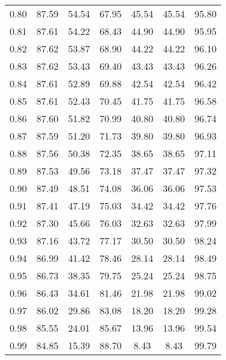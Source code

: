 \begin{tabular}{|c|c|c|c|c|c|c|}
      0.80 &     87.59 &     54.54 &      67.95 &   45.54 &      45.54 &         95.80 \\
      0.81 &     87.61 &     54.22 &      68.43 &   44.90 &      44.90 &         95.95 \\
      0.82 &     87.62 &     53.87 &      68.90 &   44.22 &      44.22 &         96.10 \\
      0.83 &     87.62 &     53.43 &      69.40 &   43.43 &      43.43 &         96.26 \\
      0.84 &     87.61 &     52.89 &      69.88 &   42.54 &      42.54 &         96.42 \\
      0.85 &     87.61 &     52.43 &      70.45 &   41.75 &      41.75 &         96.58 \\
      0.86 &     87.60 &     51.82 &      70.99 &   40.80 &      40.80 &         96.74 \\
      0.87 &     87.59 &     51.20 &      71.73 &   39.80 &      39.80 &         96.93 \\
      0.88 &     87.56 &     50.38 &      72.35 &   38.65 &      38.65 &         97.11 \\
      0.89 &     87.53 &     49.56 &      73.18 &   37.47 &      37.47 &         97.32 \\
      0.90 &     87.49 &     48.51 &      74.08 &   36.06 &      36.06 &         97.53 \\
      0.91 &     87.41 &     47.19 &      75.03 &   34.42 &      34.42 &         97.76 \\
      0.92 &     87.30 &     45.66 &      76.03 &   32.63 &      32.63 &         97.99 \\
      0.93 &     87.16 &     43.72 &      77.17 &   30.50 &      30.50 &         98.24 \\
      0.94 &     86.99 &     41.42 &      78.46 &   28.14 &      28.14 &         98.49 \\
      0.95 &     86.73 &     38.35 &      79.75 &   25.24 &      25.24 &         98.75 \\
      0.96 &     86.43 &     34.61 &      81.46 &   21.98 &      21.98 &         99.02 \\
      0.97 &     86.02 &     29.86 &      83.08 &   18.20 &      18.20 &         99.28 \\
      0.98 &     85.55 &     24.01 &      85.67 &   13.96 &      13.96 &         99.54 \\
      0.99 &     84.85 &     15.39 &      88.70 &    8.43 &       8.43 &         99.79 \\
\bottomrule
\end{tabular}
